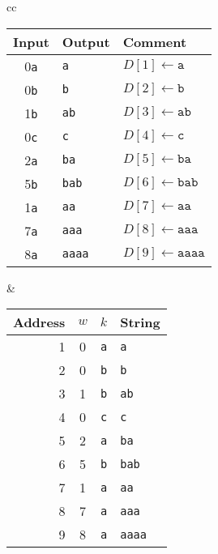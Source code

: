 \documentclass{article}
\begin{document}
\thispagestyle{empty}
\begin{tabular}{cc}
  \begin{tabular}{cll}
    Input & Output & Comment \\
    \hline
    0{\tt a} & {\tt          a} & $D[1]\leftarrow\mathtt{a}$\\
    0{\tt b} & {\tt          b} & $D[2]\leftarrow\mathtt{b}$\\
    1{\tt b} & {\tt         ab} & $D[3]\leftarrow\mathtt{ab}$\\
    0{\tt c} & {\tt          c} & $D[4]\leftarrow\mathtt{c}$\\
    2{\tt a} & {\tt         ba} & $D[5]\leftarrow\mathtt{ba}$\\
    5{\tt b} & {\tt        bab} & $D[6]\leftarrow\mathtt{bab}$\\
    1{\tt a} & {\tt         aa} & $D[7]\leftarrow\mathtt{aa}$\\
    7{\tt a} & {\tt        aaa} & $D[8]\leftarrow\mathtt{aaa}$\\
    8{\tt a} & {\tt       aaaa} & $D[9]\leftarrow\mathtt{aaaa}$
  \end{tabular}
  &
  \begin{tabular}{rccl}
    Address & $w$ & $k$ & String \\
    \hline
    1 & 0 & {\tt a} & {\tt a}\\
    2 & 0 & {\tt b} & {\tt b}\\
    3 & 1 & {\tt b} & {\tt ab}\\
    4 & 0 & {\tt c} & {\tt c}\\
    5 & 2 & {\tt a} & {\tt ba}\\
    6 & 5 & {\tt b} & {\tt bab}\\
    7 & 1 & {\tt a} & {\tt aa}\\
    8 & 7 & {\tt a} & {\tt aaa}\\
    9 & 8 & {\tt a} & {\tt aaaa}
  \end{tabular}
\end{tabular}
\end{document}
